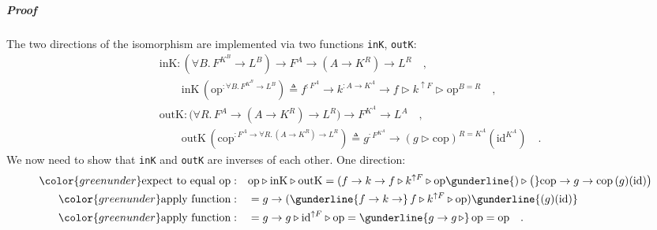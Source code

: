 \subparagraph{Proof}

The two directions of the isomorphism are implemented via two functions
\lstinline!inK!, \lstinline!outK!:
\begin{align*}
 & \text{inK}:(\forall B.\,F^{K^{B}}\rightarrow L^{B})\rightarrow F^{A}\rightarrow(A\rightarrow K^{R})\rightarrow L^{R}\quad,\\
 & \quad\quad\text{inK}\,(\text{op}^{:\forall B.\,F^{K^{B}}\rightarrow L^{B}})\triangleq f^{:F^{A}}\rightarrow k^{:A\rightarrow K^{A}}\rightarrow f\triangleright k^{\uparrow F}\triangleright\text{op}^{B=R}\quad,\\
 & \text{outK}:\big(\forall R.\,F^{A}\rightarrow(A\rightarrow K^{R})\rightarrow L^{R}\big)\rightarrow F^{K^{A}}\rightarrow L^{A}\quad,\\
 & \quad\quad\text{outK}\,(\text{cop}^{:F^{A}\rightarrow\forall R.\,(A\rightarrow K^{R})\rightarrow L^{R}})\triangleq g^{:F^{K^{A}}}\rightarrow(g\triangleright\text{cop})^{R=K^{A}}(\text{id}^{K^{A}})\quad.
\end{align*}
We now need to show that \lstinline!inK! and \lstinline!outK! are
inverses of each other. One direction:
\begin{align*}
{\color{greenunder}\text{expect to equal }\text{op}:}\quad & \text{op}\triangleright\text{inK}\triangleright\text{outK}=(f\rightarrow k\rightarrow f\triangleright k^{\uparrow F}\triangleright\text{op}\gunderline{)\triangleright\big(}\text{cop}\rightarrow g\rightarrow\text{cop}\,(g)(\text{id})\big)\\
{\color{greenunder}\text{apply function}:}\quad & =g\rightarrow(\gunderline{f\rightarrow k\rightarrow}\,f\triangleright k^{\uparrow F}\triangleright\text{op})\gunderline{(g)(\text{id})}\\
{\color{greenunder}\text{apply function}:}\quad & =g\rightarrow g\triangleright\text{id}^{\uparrow F}\triangleright\text{op}=\gunderline{g\rightarrow g\,\triangleright}\,\text{op}=\text{op}\quad.
\end{align*}

